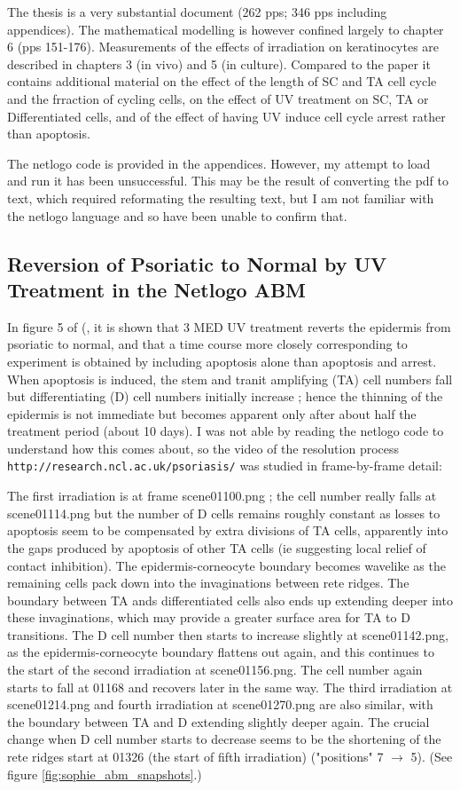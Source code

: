 \documentclass[a4paper,10pt]{report}
\begin{document}
The thesis is a very substantial document (262 pps; 346 pps including appendices). The mathematical modelling is however confined largely to chapter 6 (pps 151-176). Measurements of the effects of irradiation on keratinocytes are described in chapters 3 (in vivo) and 5 (in culture). Compared to the paper it contains additional material on the effect of the length of SC and TA cell cycle and the frraction of cycling cells, on the effect of UV treatment on SC, TA or Differentiated cells, and of the effect of having UV induce cell cycle arrest rather than apoptosis.  

The netlogo code is provided in the appendices. However, my attempt to load and run it has been unsuccessful. This may be the result of converting the pdf to text, which required reformating the resulting text, but I am not familiar with the netlogo language and so have been unable to confirm that. 

\subsection{Reversion of Psoriatic to Normal by UV Treatment in the Netlogo ABM}

In figure 5 of (\cite{weatherhead2011keratinocyte}, it is shown that 3 MED UV treatment reverts the epidermis from psoriatic to normal, and that a time course more closely corresponding to experiment is obtained by including apoptosis alone than apoptosis and arrest. When apoptosis is induced, the stem and tranit amplifying (TA) cell numbers fall but differentiating (D) cell numbers initially increase ; hence the thinning of the epidermis is not immediate but becomes apparent only after about half the treatment period (about 10 days). I was not able by reading the netlogo code to understand how this comes about, so the video of the resolution process
{\tt http://research.ncl.ac.uk/psoriasis/} was studied in frame-by-frame
detail:

The first irradiation is at frame scene01100.png ; the cell number 
really falls at scene01114.png but the number of D cells remains roughly constant
as losses to apoptosis seem to be compensated by extra divisions of TA cells,
apparently into the gaps produced by apoptosis of other TA cells (ie suggesting
local relief of contact inhibition). The epidermis-corneocyte boundary becomes wavelike as the remaining cells pack down into the invaginations between rete ridges. The boundary between TA ands differentiated cells also ends up extending deeper into these invaginations, which may provide a greater surface area for TA to D transitions. The D cell number then starts to increase slightly at scene01142.png, as the epidermis-corneocyte boundary flattens out again,  and  this continues to the start of the second irradiation at scene01156.png. The cell number again starts to fall at 01168 and recovers later in the same way. The third irradiation at  scene01214.png and fourth irradiation at  scene01270.png are also similar, with the boundary between TA and D extending slightly deeper again. The crucial change when D cell number starts to decrease seems to be 
the shortening of the rete ridges start at 01326 (the start of fifth irradiation) ("positions" 7 $\rightarrow$ 5). (See figure \ref{fig:sophie_abm_snapshots}.)
\end{document}
